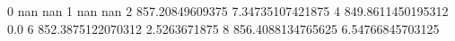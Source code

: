 0 nan nan
1 nan nan
2 857.20849609375 7.34735107421875
4 849.8611450195312 0.0
6 852.3875122070312 2.5263671875
8 856.4088134765625 6.54766845703125
